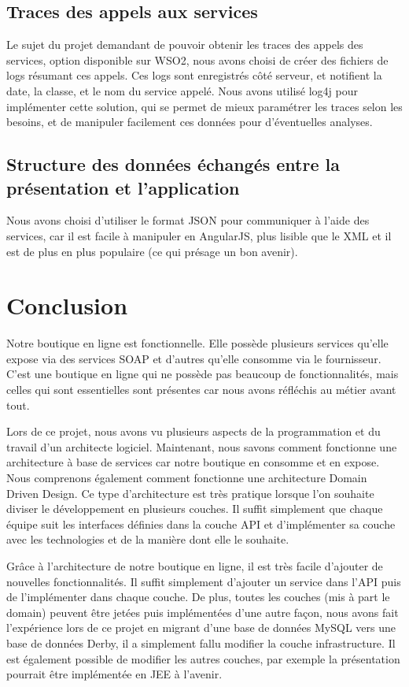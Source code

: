 \documentclass[a4paper]{article}
\begin{document}
\subsection{Traces des appels aux services}
    Le sujet du projet demandant de pouvoir obtenir les traces des appels des services, option disponible sur WSO2, nous avons choisi de créer des fichiers de logs résumant ces appels. Ces logs sont enregistrés côté serveur, et notifient la date, la classe, et le nom du service appelé. Nous avons utilisé log4j pour implémenter cette solution, qui se permet de mieux paramétrer les traces selon les besoins, et de manipuler facilement ces données pour d'éventuelles analyses.

\subsection{Structure des données échangés entre la présentation et l'application }
    Nous avons choisi d'utiliser le format JSON pour communiquer à l'aide des services, car il est facile à manipuler en AngularJS, plus lisible que le XML et il est de plus en plus populaire (ce qui présage un bon avenir).
    
\newpage

\section{Conclusion}

    Notre boutique en ligne est fonctionnelle. Elle possède plusieurs services qu'elle expose via des services SOAP et d'autres qu'elle consomme via le fournisseur. C'est une boutique en ligne qui ne possède pas beaucoup de fonctionnalités, mais celles qui sont essentielles sont présentes car nous avons réfléchis au métier avant tout.
    
    \bigskip
    
    Lors de ce projet, nous avons vu plusieurs aspects de la programmation et du travail d'un architecte logiciel. Maintenant, nous savons comment fonctionne une architecture à base de services car notre boutique en consomme et en expose. Nous comprenons également comment fonctionne une architecture Domain Driven Design. Ce type d'architecture est très pratique lorsque l'on souhaite diviser le développement en plusieurs couches. Il suffit simplement que chaque équipe suit les interfaces définies dans la couche API et d'implémenter sa couche avec les technologies et de la manière dont elle le souhaite.
    
    \bigskip
    
    Grâce à l'architecture de notre boutique en ligne, il est très facile d'ajouter de nouvelles fonctionnalités. Il suffit simplement d'ajouter un service dans l'API puis de l'implémenter dans chaque couche. De plus, toutes les couches (mis à part le domain) peuvent être jetées puis implémentées d'une autre façon, nous avons fait l'expérience lors de ce projet en migrant d'une base de données MySQL vers une base de données Derby, il a simplement fallu modifier la couche infrastructure. Il est également possible de modifier les autres couches, par exemple la présentation pourrait être implémentée en JEE à l'avenir. 
    
\end{document}
